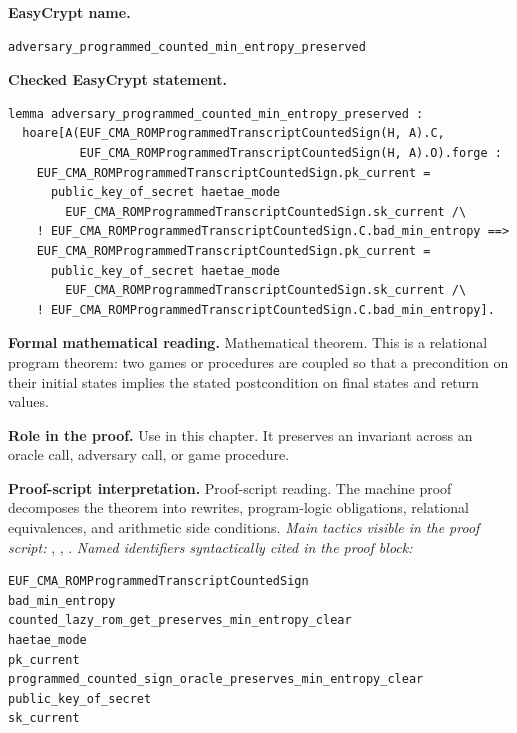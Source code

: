 \begin{formaltheorem}
\noindent\textbf{EasyCrypt name.}
\begin{lstlisting}[language=EasyCrypt,basicstyle=\ttfamily\scriptsize]
adversary_programmed_counted_min_entropy_preserved
\end{lstlisting}
\noindent\textbf{Checked EasyCrypt statement.}
\begin{lstlisting}[language=EasyCrypt,basicstyle=\ttfamily\scriptsize]
lemma adversary_programmed_counted_min_entropy_preserved :
  hoare[A(EUF_CMA_ROMProgrammedTranscriptCountedSign(H, A).C,
          EUF_CMA_ROMProgrammedTranscriptCountedSign(H, A).O).forge :
    EUF_CMA_ROMProgrammedTranscriptCountedSign.pk_current =
      public_key_of_secret haetae_mode
        EUF_CMA_ROMProgrammedTranscriptCountedSign.sk_current /\
    ! EUF_CMA_ROMProgrammedTranscriptCountedSign.C.bad_min_entropy ==>
    EUF_CMA_ROMProgrammedTranscriptCountedSign.pk_current =
      public_key_of_secret haetae_mode
        EUF_CMA_ROMProgrammedTranscriptCountedSign.sk_current /\
    ! EUF_CMA_ROMProgrammedTranscriptCountedSign.C.bad_min_entropy].
\end{lstlisting}
\noindent\textbf{Formal mathematical reading.}
Mathematical theorem. This is a relational program theorem: two games or procedures are coupled so that a precondition on their initial states implies the stated postcondition on final states and return values.

\noindent\textbf{Role in the proof.}
Use in this chapter. It preserves an invariant across an oracle call, adversary call, or game procedure.

\noindent\textbf{Proof-script interpretation.}
Proof-script reading. The machine proof decomposes the theorem into rewrites, program-logic obligations, relational equivalences, and arithmetic side conditions.
\emph{Main tactics visible in the proof script:} , , .
\emph{Named identifiers syntactically cited in the proof block:}
\begin{lstlisting}[language=EasyCrypt,basicstyle=\ttfamily\scriptsize]
EUF_CMA_ROMProgrammedTranscriptCountedSign
bad_min_entropy
counted_lazy_rom_get_preserves_min_entropy_clear
haetae_mode
pk_current
programmed_counted_sign_oracle_preserves_min_entropy_clear
public_key_of_secret
sk_current
\end{lstlisting}

\end{formaltheorem}

